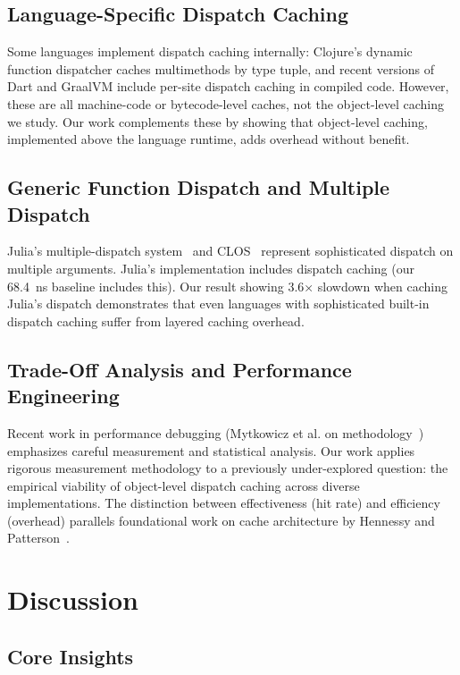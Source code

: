 \documentclass[sigplan,final,acmsmall,review,screen]{acmart}
\begin{document}
\subsection{Language-Specific Dispatch Caching}

Some languages implement dispatch caching internally: Clojure's dynamic function dispatcher caches multimethods by type tuple,
and recent versions of Dart and GraalVM include per-site dispatch caching in compiled code. However, these are all machine-code or
bytecode-level caches, not the object-level caching we study. Our work complements these by showing that object-level caching,
implemented above the language runtime, adds overhead without benefit.

\subsection{Generic Function Dispatch and Multiple Dispatch}

Julia's multiple-dispatch system~\cite{julia-lang} and CLOS~\cite{keene1989object} represent sophisticated dispatch on multiple arguments.
Julia's implementation includes dispatch caching (our 68.4~ns baseline includes this). Our result showing 3.6× slowdown when caching Julia's
dispatch demonstrates that even languages with sophisticated built-in dispatch caching suffer from layered caching overhead.

\subsection{Trade-Off Analysis and Performance Engineering}

Recent work in performance debugging (Mytkowicz et al. on methodology~\cite{mytkowicz2009producing}) emphasizes careful measurement
and statistical analysis. Our work applies rigorous measurement methodology to a previously under-explored question: the empirical
viability of object-level dispatch caching across diverse implementations. The distinction between effectiveness (hit rate) and efficiency (overhead)
parallels foundational work on cache architecture by Hennessy and Patterson~\cite{hennessy2011computer}.

\section{Discussion}
\label{sec:discussion}

\subsection{Core Insights}
\end{document}
